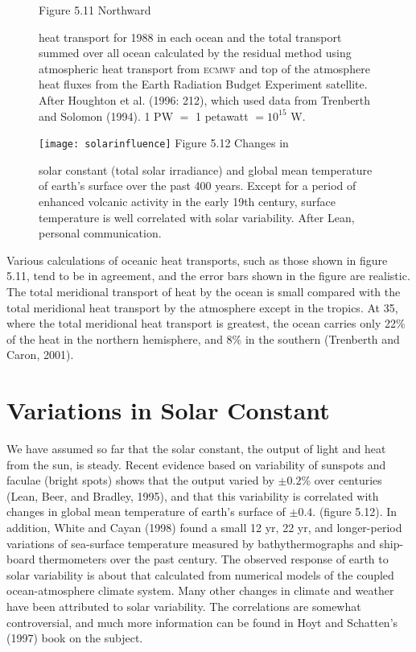 \begin{figure}[t!]
\footnotesize
Figure 5.11 Northward \rule{0mm}{3ex}heat transport for 1988 in
each ocean and the total transport summed over all ocean calculated by
the residual method using atmospheric heat transport from \textsc{ecmwf} and
top of the atmosphere heat fluxes from the
Earth Radiation Budget Experiment satellite. After Houghton et al. (1996: 212), which used data
from Trenberth and Solomon (1994). 1 PW $=$ 1 petawatt $= 10^{15}$ W.
\label{fig:heattransport}
\vspace{-4ex}
\end{figure}
\begin{figure}[b!]
\vspace{-5ex}
\texttt{[image: solarinfluence]}
\footnotesize
Figure 5.12 Changes in \rule{0mm}{3ex}solar constant
(total solar irradiance) and global mean temperature of earth's surface over the past 400
years. Except for a period of enhanced volcanic activity in the early 19th
century, surface temperature is well correlated with solar variability. After
Lean, personal communication.
\label{fig:solarinfluence}
\end{figure}

Various calculations of oceanic heat transports, such as those shown in
figure 5.11, tend to be in agreement, and the error bars shown in the figure are realistic.
The total meridional transport of heat by the ocean is small compared with the total
meridional heat transport by the atmosphere except in the tropics. At 35\degrees, where the
total meridional heat transport is greatest, the ocean carries only 22\% of the heat in the
northern hemisphere, and 8\% in the southern (Trenberth and Caron, 2001).


\section{Variations in Solar Constant}
We have assumed so far that the solar constant, the output
of light and heat from the sun, is steady. Recent evidence based on variability of
sunspots and faculae (bright spots) shows that the output varied by $\pm 0.2$\% over
centuries (Lean, Beer, and Bradley, 1995), and that this variability is correlated
with changes in global mean temperature of earth's surface of $\pm 0.4$.
(figure 5.12). In addition, White and Cayan (1998) found a small 12 yr, 22 yr, and
longer-period variations of sea-surface temperature measured by
bathythermographs and ship-board thermometers over the past
century. The observed response of earth to solar variability is about that calculated from
numerical models of the coupled ocean-atmosphere climate system. Many other changes in climate
and weather have been attributed to solar variability. The correlations are somewhat
controversial, and much more information can be found in Hoyt and Schatten's (1997) book on the
subject.

